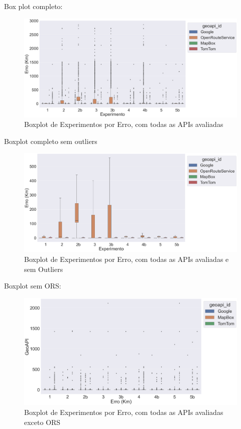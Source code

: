 Box plot completo:

\begin{figure}[h]
    \centering
    \includegraphics[width=\textwidth]{Figuras/boxplotExperimento.png}
    \caption{Boxplot de Experimentos por Erro, com todas as APIs avaliadas }
    \label{fig:boxplot-completo}
\end{figure}

Boxplot completo sem outliers

\begin{figure}[h]
    \centering
    \includegraphics[width=\textwidth]{Figuras/boxplotExperimentoSemOut.png}
    \caption{Boxplot de Experimentos por Erro, com todas as APIs avaliadas e sem Outliers}
    \label{fig:boxplot-semout}
\end{figure}

Boxplot sem ORS:

\begin{figure}[h]
    \centering
    \includegraphics[width=\textwidth]{Figuras/boxplotExperimentoSemORS.png}
    \caption{Boxplot de Experimentos por Erro, com todas as APIs avaliadas exceto ORS}
    \label{fig:boxplot-semors}
\end{figure}

